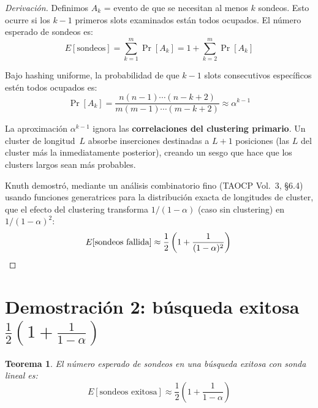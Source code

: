 \documentclass[11pt, letterpaper]{article}
\theoremstyle{definition}
\theoremstyle{plain}
\newtheorem{theorem}{Teorema}[section]
\theoremstyle{remark}
\begin{document}
\begin{proof}[Derivación]
Definimos $A_k$ = evento de que se necesitan al menos $k$ sondeos.
Esto ocurre si los $k{-}1$ primeros slots examinados están todos
ocupados. El número esperado de sondeos es:
\[
  E[\text{sondeos}]
  = \sum_{k=1}^{m} \Pr[A_k]
  = 1 + \sum_{k=2}^{m} \Pr[A_k]
\]

Bajo hashing uniforme, la probabilidad de que $k{-}1$ slots
consecutivos específicos estén todos ocupados es:
\[
  \Pr[A_k]
  = \frac{n(n{-}1)\cdots(n{-}k{+}2)}{m(m{-}1)\cdots(m{-}k{+}2)}
  \approx \alpha^{k-1}
\]

La aproximación $\alpha^{k-1}$ ignora las \textbf{correlaciones del
clustering primario}. Un cluster de longitud~$L$ absorbe inserciones
destinadas a $L + 1$ posiciones (las $L$ del cluster más la
inmediatamente posterior), creando un sesgo que hace que los clusters
largos sean más probables.

Knuth demostró, mediante un análisis combinatorio fino (TAOCP Vol.~3,
\S6.4) usando funciones generatrices para la distribución exacta de
longitudes de cluster, que el efecto del clustering transforma
$1/(1{-}\alpha)$ (caso sin clustering) en $1/(1{-}\alpha)^2$:
\[
  E[\text{sondeos fallida}]
  \approx \frac{1}{2}\left(1 + \frac{1}{(1-\alpha)^2}\right) \qedhere
\]
\end{proof}

\section{Demostración 2: búsqueda exitosa
  \texorpdfstring{$\frac{1}{2}\!\left(1 + \frac{1}{1-\alpha}\right)$}%
  {1/2(1 + 1/(1-alpha))}}

\begin{theorem}\label{thm:hit}
El número esperado de sondeos en una búsqueda exitosa con sonda lineal
es:
\[
  E[\text{sondeos exitosa}]
  \approx \frac{1}{2}\left(1 + \frac{1}{1-\alpha}\right)
\]
\end{theorem}
\end{document}
